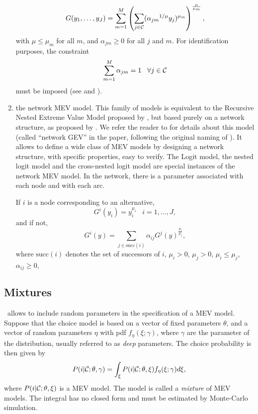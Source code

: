 \documentclass[12pt]{memoir}
\begin{document}
\begin{enumerate}
         \begin{equation}
G(y_1,\ldots,y_J) = \sum_{m=1}^M \left(\sum_{j\in \mathcal{C}}({\alpha_{jm}}^{1/\mu}
y_{j})^{\mu_{m}}\right)^\frac{\mu}{\mu_{m}},
         \end{equation}
         with $\mu \leq \mu_m$ for all $m$, and $\alpha_{jm}\geq 0$ for all
         $j$ and $m$. For identification purposes, the constraint
\[
\sum_{m=1}^M \alpha_{jm} = 1 \;\;\; \forall j \in \mathcal{C}
\]
must be imposed (see \cite{WenKopp01} and \cite{AbbeBierTole07}).

      \item the network MEV model. This family of models is equivalent to the Recursive Nested Extreme
         Value Model proposed by , but based purely on a network
         structure, as proposed by . We refer the
         reader to  for details about this
         model (called ``network GEV'' in the paper, following the
         original naming of \cite{McFa78}). It allows to define a wide class of MEV models
         by designing a network structure, with specific properties, easy to
         verify. The  Logit model, the nested logit model and the
         cross-nested logit model are
         special instances of the network MEV model. In the network, there is a
         parameter associated with each node and with each arc.

         If $i$ is a node corresponding to an alternative,
         \[
          G^i(y_{i}) = y_i^{\mu_i} \;\;\; i=1,\ldots,J,
         \]
         and if not,
         \[
         G^i(y) = \sum_{j \in \text{succ}(i)} \alpha_{ij} G^j(y)^{\frac{\mu_i}{\mu_j}},
         \]
         where $\text{succ}(i)$ denotes the set of successors of $i$,
         $\mu_i > 0$, $\mu_j > 0$, $\mu_i \leq \mu_j$, $\alpha_{ij} \geq 0$, 

   \end{enumerate}

   \subsection{Mixtures}

      \BIOGEME\ allows to include random parameters in the
      specification of a MEV model. Suppose that the choice model is
      based on  a vector of
      fixed parameters $\theta$, and a vector of random parameters $\eta$
      with pdf $f_\eta(\xi;\gamma)$, where $\gamma$ are the parameter
      of the distribution, usually referred to as \emph{deep}
      parameters. The choice probability is then given by
\begin{equation}
\label{eq:mixtures}
P(i|\mathcal{C};\theta,\gamma) = \int_{\xi} P(i|\mathcal{C};\theta,\xi)
f_\eta(\xi;\gamma) d\xi, 
\end{equation}
where $P(i|\mathcal{C};\theta,\xi)$ is a MEV model. The model 
is called a \emph{mixture} of MEV models. The integral has no closed
form and must be estimated by Monte-Carlo simulation.
\end{document}
